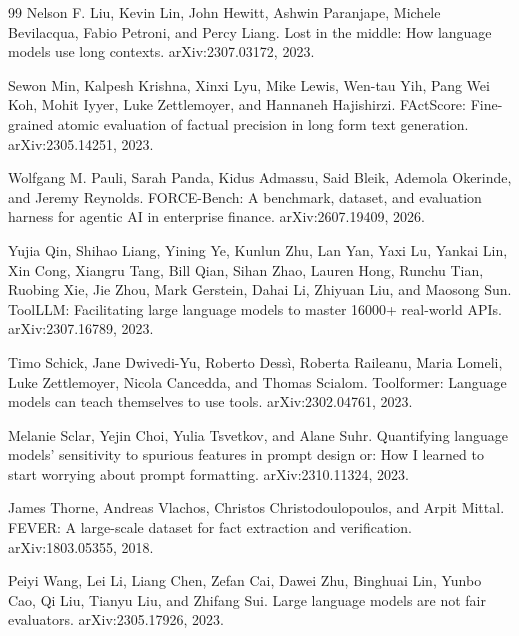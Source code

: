 \begin{thebibliography}{99}
 Nelson F. Liu, Kevin Lin,
John Hewitt, Ashwin Paranjape, Michele Bevilacqua, Fabio Petroni,
and Percy Liang.
\newblock Lost in the middle: How language models use long contexts.
\newblock arXiv:2307.03172, 2023.

 Sewon Min, Kalpesh Krishna, Xinxi Lyu,
Mike Lewis, Wen-tau Yih, Pang Wei Koh, Mohit Iyyer, Luke Zettlemoyer,
and Hannaneh Hajishirzi.
\newblock FActScore: Fine-grained atomic evaluation of factual precision
in long form text generation.
\newblock arXiv:2305.14251, 2023.

 Wolfgang M. Pauli, Sarah Panda,
Kidus Admassu, Said Bleik, Ademola Okerinde, and Jeremy Reynolds.
\newblock FORCE-Bench: A benchmark, dataset, and evaluation harness for
agentic AI in enterprise finance.
\newblock arXiv:2607.19409, 2026.

 Yujia Qin, Shihao Liang, Yining Ye,
Kunlun Zhu, Lan Yan, Yaxi Lu, Yankai Lin, Xin Cong, Xiangru Tang,
Bill Qian, Sihan Zhao, Lauren Hong, Runchu Tian, Ruobing Xie, Jie Zhou,
Mark Gerstein, Dahai Li, Zhiyuan Liu, and Maosong Sun.
\newblock ToolLLM: Facilitating large language models to master 16000+
real-world APIs.
\newblock arXiv:2307.16789, 2023.

 Timo Schick, Jane Dwivedi-Yu,
Roberto Dess{\`i}, Roberta Raileanu, Maria Lomeli, Luke Zettlemoyer,
Nicola Cancedda, and Thomas Scialom.
\newblock Toolformer: Language models can teach themselves to use tools.
\newblock arXiv:2302.04761, 2023.

 Melanie Sclar, Yejin Choi,
Yulia Tsvetkov, and Alane Suhr.
\newblock Quantifying language models' sensitivity to spurious features in
prompt design or: How I learned to start worrying about prompt formatting.
\newblock arXiv:2310.11324, 2023.

 James Thorne, Andreas Vlachos,
Christos Christodoulopoulos, and Arpit Mittal.
\newblock FEVER: A large-scale dataset for fact extraction and verification.
\newblock arXiv:1803.05355, 2018.

 Peiyi Wang, Lei Li, Liang Chen,
Zefan Cai, Dawei Zhu, Binghuai Lin, Yunbo Cao, Qi Liu, Tianyu Liu,
and Zhifang Sui.
\newblock Large language models are not fair evaluators.
\newblock arXiv:2305.17926, 2023.


\end{thebibliography}
